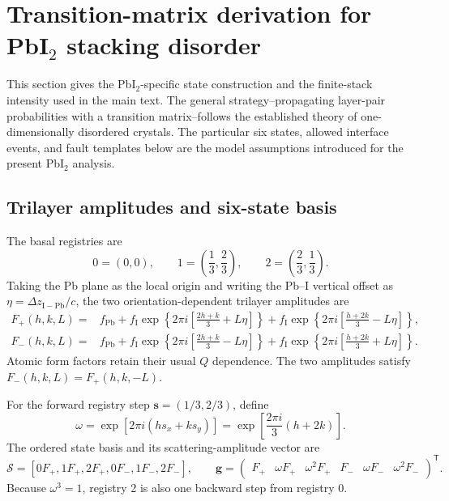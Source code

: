 \documentclass[11pt]{article}
\begin{document}
\section{Transition-matrix derivation for PbI\texorpdfstring{$_2$}{2} stacking disorder}
\label{sec:si_pbi2_transition}

This section gives the PbI$_2$-specific state construction and the finite-stack
intensity used in the main text.  The general strategy--propagating layer-pair
probabilities with a transition matrix--follows the established theory of
one-dimensionally disordered crystals.\cite{HendricksTeller1942,KakinokiKomura1954,KakinokiKomura1965,Hart2018}
The particular six states, allowed interface events, and fault templates below
are the model assumptions introduced for the present PbI$_2$ analysis.

\subsection{Trilayer amplitudes and six-state basis}

The basal registries are
\begin{equation}
  0=(0,0),\qquad
  1=\left(\frac13,\frac23\right),\qquad
  2=\left(\frac23,\frac13\right).
  \label{eq:si_pbi2_registries}
\end{equation}
Taking the Pb plane as the local origin and writing the Pb--I vertical offset
as $\eta=\Delta z_{\mathrm{I-Pb}}/c$, the two orientation-dependent trilayer
amplitudes are
\begin{align}
 F_+(h,k,L)={}&f_{\mathrm{Pb}}+
 f_{\mathrm I}\exp\!\left\{2\pi i\left[\frac{2h+k}{3}+L\eta\right]\right\}
 +f_{\mathrm I}\exp\!\left\{2\pi i\left[\frac{h+2k}{3}-L\eta\right]\right\},
 \label{eq:si_pbi2_Fplus}\\
 F_-(h,k,L)={}&f_{\mathrm{Pb}}+
 f_{\mathrm I}\exp\!\left\{2\pi i\left[\frac{2h+k}{3}-L\eta\right]\right\}
 +f_{\mathrm I}\exp\!\left\{2\pi i\left[\frac{h+2k}{3}+L\eta\right]\right\}.
 \label{eq:si_pbi2_Fminus}
\end{align}
Atomic form factors retain their usual $Q$ dependence.  The two amplitudes
satisfy $F_-(h,k,L)=F_+(h,k,-L)$.

For the forward registry step $\mathbf{s}=(1/3,2/3)$, define
\begin{equation}
  \omega=\exp\!\left[2\pi i(hs_x+ks_y)\right]
  =\exp\!\left[\frac{2\pi i}{3}(h+2k)\right].
  \label{eq:si_pbi2_omega}
\end{equation}
The ordered state basis and its scattering-amplitude vector are
\begin{equation}
 \mathcal{S}=[0F_+,1F_+,2F_+,0F_-,1F_-,2F_-],\qquad
 \mathbf{g}=\begin{pmatrix}
 F_+&\omega F_+&\omega^2F_+&F_-&\omega F_-&\omega^2F_-
 \end{pmatrix}^{\mathsf T}.
 \label{eq:si_pbi2_state_amplitudes}
\end{equation}
Because $\omega^3=1$, registry 2 is also one backward step from registry 0.
\end{document}
